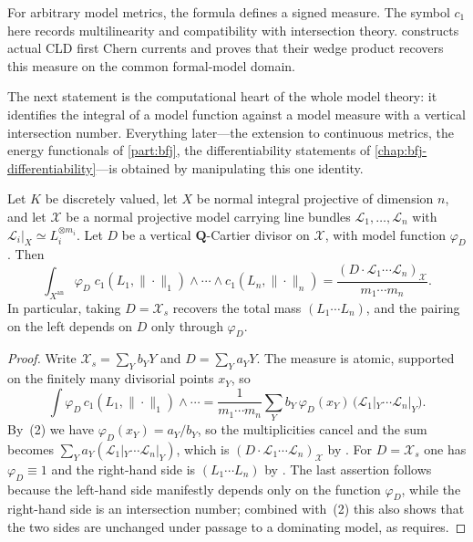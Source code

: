 \begin{remark}
\label{rem:metrics-model-measure-signed}
For arbitrary model metrics, the formula defines a signed measure. The
symbol $c_1$ here records multilinearity and compatibility with
intersection theory.  constructs actual CLD first Chern currents
and proves that their wedge product recovers this measure on the common
formal-model domain.
\end{remark}

The next statement is the computational heart of the whole model theory: it
identifies the integral of a model function against a model measure with a
vertical intersection number. Everything later---the extension to continuous
metrics, the energy functionals of \cref{part:bfj}, the differentiability
statements of \cref{chap:bfj-differentiability}---is obtained by
manipulating this one identity.

\begin{proposition}
\label{prop:metrics-cl-model-function-integral}
Let $K$ be discretely valued, let $X$ be normal integral projective of dimension
$n$, and let $\mathcal X$ be a normal projective model carrying line
bundles $\mathcal L_1,\ldots,\mathcal L_n$ with
$\mathcal L_i|_X\simeq L_i^{\otimes m_i}$. Let $D$ be a vertical
$\mathbf Q$-Cartier divisor on $\mathcal X$, with model function
$\varphi_D$. Then
\begin{equation}
\label{eq:metrics-cl-pairing}
 \int_{X^{\mathrm{an}}}\varphi_D\;
 c_1(L_1,\|\cdot\|_1)\wedge\cdots\wedge c_1(L_n,\|\cdot\|_n)
 =\frac{(D\cdot\mathcal L_1\cdots\mathcal L_n)_{\mathcal X}}
        {m_1\cdots m_n}.
\end{equation}
In particular, taking $D=\mathcal X_s$ recovers the total mass
$(L_1\cdots L_n)$, and the pairing on the left depends on $D$ only
through $\varphi_D$.
\end{proposition}

\begin{proof}
Write $\mathcal X_s=\sum_Yb_YY$ and $D=\sum_Ya_YY$. The measure is
atomic, supported on the finitely many divisorial points $x_Y$, so
\[
 \int\varphi_D\,c_1(L_1,\|\cdot\|_1)\wedge\cdots
 =\frac1{m_1\cdots m_n}\sum_Yb_Y\,\varphi_D(x_Y)\,
   \bigl(\mathcal L_1|_Y\cdots\mathcal L_n|_Y\bigr).
\]
By \,(2) we have
$\varphi_D(x_Y)=a_Y/b_Y$, so the multiplicities cancel and the sum becomes
$\sum_Ya_Y(\mathcal L_1|_Y\cdots\mathcal L_n|_Y)$, which is
$(D\cdot\mathcal L_1\cdots\mathcal L_n)_{\mathcal X}$ by
. For $D=\mathcal X_s$ one has
$\varphi_D\equiv1$ and the right-hand side is $(L_1\cdots L_n)$ by
. The last assertion follows because the
left-hand side manifestly depends only on the function $\varphi_D$, while
the right-hand side is an intersection number; combined with
\,(2) this also shows that the two
sides are unchanged under passage to a dominating model, as
 requires.
\end{proof}

